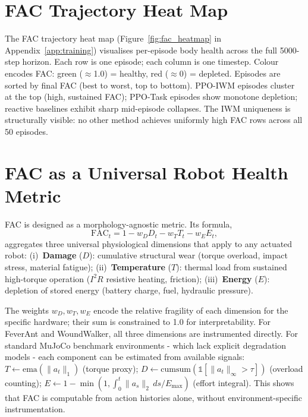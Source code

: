 \documentclass{article}
\begin{document}
{\section{FAC Trajectory Heat Map}
\label{app:fac_heatmap}
The FAC trajectory heat map (Figure~\ref{fig:fac_heatmap} in Appendix~\ref{app:training}) visualises per-episode body health across the full 5000-step horizon. Each row is one episode; each column is one timestep. Colour encodes FAC: green ($\approx$1.0) = healthy, red ($\approx$0) = depleted. Episodes are sorted by final FAC (best to worst, top to bottom). PPO-IWM episodes cluster at the top (high, sustained FAC); PPO-Task episodes show monotone depletion; reactive baselines exhibit sharp mid-episode collapses. The IWM uniqueness is structurally visible: no other method achieves uniformly high FAC rows across all 50 episodes.

\section{FAC as a Universal Robot Health Metric}
\label{app:fac_universality}

FAC is designed as a morphology-agnostic metric.  Its formula, \[ \mathrm{FAC}_t = 1 - w_D D_t - w_T T_t - w_E E_t, \] aggregates three universal physiological dimensions that apply to any actuated robot: (i)~\textbf{Damage} ($D$): cumulative structural wear (torque overload, impact stress, material fatigue); (ii)~\textbf{Temperature} ($T$): thermal load from sustained high-torque operation ($I^2R$ resistive heating, friction); (iii)~\textbf{Energy} ($E$): depletion of stored energy (battery charge, fuel, hydraulic pressure).

The weights $w_D, w_T, w_E$ encode the relative fragility of each dimension for the specific hardware; their sum is constrained to 1.0 for interpretability. For FeverAnt and WoundWalker, all three dimensions are instrumented directly. For standard MuJoCo benchmark environments - which lack explicit degradation models - each component can be estimated from available signals: $T \leftarrow \mathrm{ema}(\|a_t\|_1)$ (torque proxy); $D \leftarrow \mathrm{cumsum}(\mathbb{1}[\|a_t\|_\infty > \tau])$ (overload counting); $E \leftarrow 1 - \min(1, \int_0^t \|a_s\|_2 \, ds / E_{\max})$ (effort integral). This shows that FAC is computable from action histories alone, without environment-specific instrumentation.

}
\end{document}
